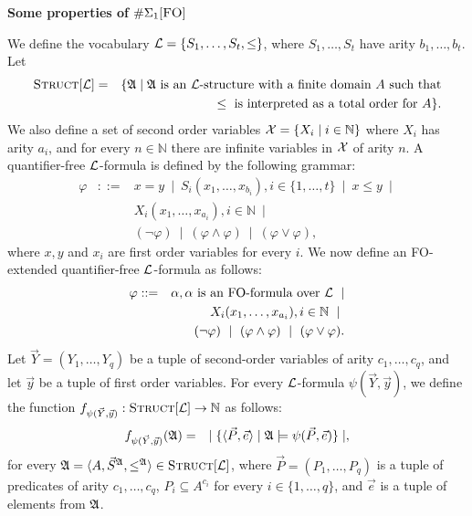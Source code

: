 \documentclass[12pt]{article}
\def\E1{\#\Sigma_1[\mbox{{\sc FO}}]}
\def\Truc{\textsc{Struct}[\L]}
\def\A{{\frak A}}
\def\L{{\cal L}}
\def\N{\mathbb{N}}
\def\P{\vec{P}}
\def\S{\vec{S}}
\def\Y{\vec{Y}}
\def\e{\vec{e}} %
\def\y{\vec{y}} %
\begin{document}
\begin{center}
{ \LARGE \bf
  Some properties of $\E1$
}
\end{center}

We define the vocabulary $\L = \{ S_1,\dots,S_t, \leq \}$, where $S_1,\dots,S_t$ have arity $b_1,\dots,b_t$. Let
\begin{eqnarray*}
\Truc &=& \{\A \mid \A \text{ is an } \L \text{-structure with a finite domain } A \text{ such that} \\
&& \leq \text{ is interpreted as a total order for } A \}.
\end{eqnarray*}
We also define a set of second order variables ${\cal X} = \{ X_i \mid i\in\N \}$ where $X_i$ has arity $a_i$, and for every $n \in \N$ there are infinite variables in ${\cal X}$ of arity $n$. A quantifier-free $\L$-formula is defined by the following grammar:
\begin{eqnarray*}
\varphi &::=& x = y \ \mid \ S_i(x_1,\dots,x_{b_i}), i \in \{1,\dots,t\} \ \mid \ x \leq y \ \mid \\
&& X_i(x_1,\dots,x_{a_i}), i\in\N \ \mid \\ 
&& (\neg \varphi) \ \mid \ (\varphi \wedge \varphi) \ \mid \ (\varphi \vee \varphi),
\end{eqnarray*}
where $x,y$ and $x_i$ are first order variables for every $i$. We now define an {\sc FO}-extended quantifier-free $\L$-formula as follows:
\begin{eqnarray*}
\varphi &::=& \alpha, \alpha \text{ is an FO-formula over } \L  \ \mid \\
&& X_i(x_1,\dots,x_{a_i}), i\in\N \ \mid \ \\
&& (\neg \varphi) \ \mid \ (\varphi \wedge \varphi) \ \mid \ (\varphi \vee \varphi).
\end{eqnarray*}
Let $\Y = (Y_1,\dots,Y_q)$ be a tuple of second-order variables of arity $c_1,\ldots,c_q$, and let $\y$ be a tuple of first order variables. For every $\L$-formula $\psi(\Y,\y)$, we define the function $f_{\psi(\Y,\y)}:\Truc \to \N$ as follows:
\begin{eqnarray*}
f_{\psi(\Y,\y)}(\A) &=& \mid \{ \langle \P, \e \rangle \mid \A \models \psi(\P,\e) \} \mid,
\end{eqnarray*}
for every $\A = \langle A, \S^{\A}, \leq^{\A} \rangle \in \Truc$, where $\P = (P_1,\ldots,P_q)$ is a tuple of predicates of arity $c_1,\ldots,c_q$, $P_i \subseteq A^{c_i}$ for every $i \in \{1,\ldots,q\}$, and $\e$ is a tuple of elements from $\A$.\\
\end{document}
